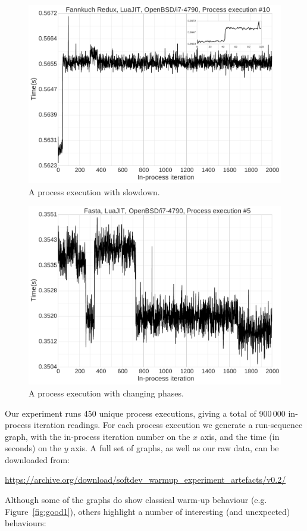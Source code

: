 \documentclass[preprint]{sigplanconf}
\begin{document}
\begin{figure}
\includegraphics[width=.5\textwidth]{examples_v2_results/bad_slowdown.pdf}
\caption{A process execution with slowdown.}
\label{fig:slowdown}
\end{figure}

\begin{figure}
\includegraphics[width=.5\textwidth]{examples_v2_results/bad_phases.pdf}
\caption{A process execution with changing phases.}
\label{fig:phases}
\end{figure}




Our experiment runs 450 unique process executions, giving a total of 900\,000
in-process iteration readings. For each process execution we generate a
run-sequence graph, with the in-process iteration number on the $x$ axis, and the
time (in seconds) on the $y$ axis. A full set of graphs, as well as our raw
data, can be downloaded from:
\vspace{-1em}
\begin{center}
{\small%
\url{https://archive.org/download/softdev_warmup_experiment_artefacts/v0.2/}
}
\end{center}

Although some of the graphs do show classical warm-up behaviour (e.g.
Figure~\ref{fig:good1}), others highlight a number of interesting (and
unexpected) behaviours:
\end{document}

